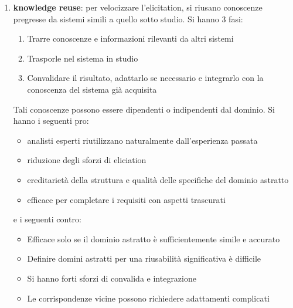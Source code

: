 \begin{itemize}
\begin{enumerate}
                  \item \textbf{knowledge reuse}: per velocizzare
                        l'elicitation, si riusano conoscenze pregresse da sistemi simili a quello
                        sotto studio. Si hanno 3 fasi:
                        \begin{enumerate}
                              \item Trarre conoscenze e informazioni rilevanti da altri sistemi
                              \item Trasporle nel sistema in studio
                              \item Convalidare il risultato, adattarlo se necessario e integrarlo
                                    con la conoscenza del sistema già acquisita
                        \end{enumerate}
                        Tali conoscenze possono essere dipendenti o indipendenti dal dominio.
                        Si hanno i seguenti pro:
                        \begin{itemize}
                              \item analisti esperti riutilizzano naturalmente dall'esperienza
                                    passata
                              \item riduzione degli sforzi di eliciation
                              \item ereditarietà della struttura e qualità delle specifiche del
                                    dominio astratto
                              \item efficace per completare i requisiti con aspetti trascurati
                        \end{itemize}
                        e i seguenti contro:
                        \begin{itemize}
                              \item Efficace solo se il dominio astratto è sufficientemente simile
                                    e accurato
                              \item Definire domini astratti per una riusabilità significativa è difficile
                              \item Si hanno forti sforzi di convalida e integrazione
                              \item Le corrispondenze vicine possono richiedere adattamenti complicati
                        \end{itemize}

\end{enumerate}
\end{itemize}

